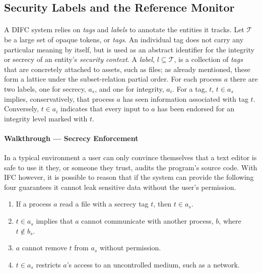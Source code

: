 \subsection{Security Labels and the Reference Monitor}

\paragraph{} A DIFC system relies on \textit{tags} and \textit{labels} to annotate the entities it tracks. Let $\mathcal{T}$ be a large set of opaque tokens, or \textit{tags}. An individual tag does not carry any particular meaning by itself, but is used as an abstract identifier for the integrity or secrecy of an entity's \textit{security context}. A \textit{label}, $l \subseteq \mathcal{T}$, is a collection of \textit{tags} that are concretely attached to assets, such as files; as already mentioned, these form a lattice under the subset-relation partial order. For each process $a$ there are two labels, one for secrecy, $a_s$, and one for integrity, $a_i$. For a tag, $t$, $t \in a_s$ implies, conservatively, that process $a$ has seen information associated with tag $t$. Conversely, $t \in a_i$ indicates that every input to $a$ has been endorsed for an integrity level marked with $t$.

\paragraph{Walkthrough --- Secrecy Enforcement} In a typical environment a user can only convince themselves that a text editor is safe to use it they, or someone they trust, audits the program's source code. With IFC however, it is possible to reason that if the system can provide the following four guarantees it cannot leak sensitive data without the user's permission.

\begin{enumerate}
    \item If a process $a$ read a file with a secrecy tag $t$, then $t \in a_s$.
    \item $t \in a_s$ implies that $a$ cannot communicate with another process, $b$, where $t \notin b_s$.
    \item $a$ cannot remove $t$ from $a_s$ without permission.
    \item $t \in a_s$ restricts $a$'s access to an uncontrolled medium, such as a network.
\end{enumerate}

